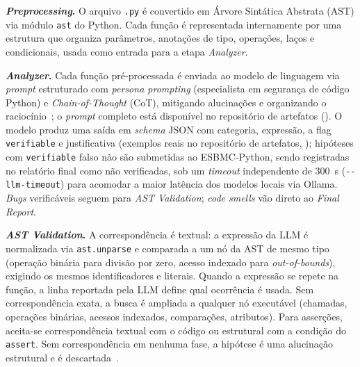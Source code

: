 \documentclass[sigconf]{acmart}
\begin{document}


\textbf{\textit{Preprocessing}.}
O arquivo \texttt{.py} é convertido em Árvore Sintática Abstrata (AST) via módulo \texttt{ast} do Python. Cada função é representada internamente por uma estrutura que organiza parâmetros, anotações de tipo, operações, laços e condicionais, usada como entrada para a etapa \textit{Analyzer}.


\textbf{\textit{Analyzer}.}
Cada função pré-processada é enviada ao modelo de linguagem via \textit{prompt} estruturado com \textit{persona prompting} (especialista em segurança de código Python) e \emph{Chain-of-Thought} (CoT), mitigando alucinações e organizando o raciocínio~\cite{souza2026beyondstrictrules,tihanyi2025vulnerability}; o \textit{prompt} completo está disponível no repositório de artefatos (). O modelo produz uma saída em \textit{schema} JSON com categoria, expressão, a flag \texttt{verifiable} e justificativa (exemplos reais no repositório de artefatos, ); hipóteses com \texttt{verifiable} falso não são submetidas ao ESBMC-Python, sendo registradas no relatório final como não verificadas, sob um \textit{timeout} independente de 300~s (\nolinkurl{--llm-timeout}) para acomodar a maior latência dos modelos locais via Ollama. \textit{Bugs} verificáveis seguem para \textit{AST Validation}; \textit{code smells} vão direto ao \textit{Final Report}.


\textbf{\textit{AST Validation}.}
A correspondência é textual: a expressão da LLM é normalizada via \texttt{ast.unparse} e comparada a um nó da AST de mesmo tipo (operação binária para divisão por zero, acesso indexado para \textit{out-of-bounds}), exigindo os mesmos identificadores e literais. Quando a expressão se repete na função, a linha reportada pela LLM define qual ocorrência é usada. Sem correspondência exata, a busca é ampliada a qualquer nó executável (chamadas, operações binárias, acessos indexados, comparações, atributos). Para asserções, aceita-se correspondência textual com o código ou estrutural com a condição do \texttt{assert}. Sem correspondência em nenhuma fase, a hipótese é uma alucinação estrutural e é descartada~\cite{khati2026forge}.
\end{document}

